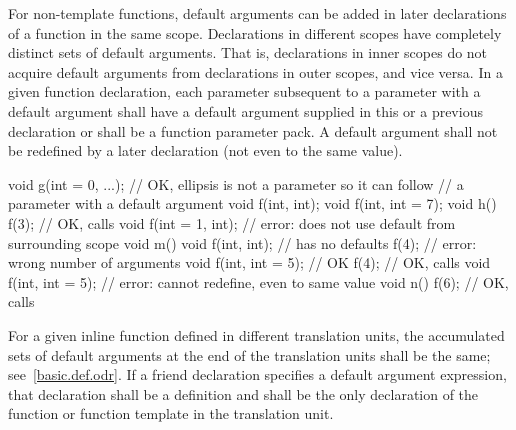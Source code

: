 \pnum
For non-template functions, default arguments can be added in later
declarations of a
function in the same scope.
Declarations in different
scopes have completely distinct sets of default arguments.
That
is, declarations in inner scopes do not acquire default
arguments from declarations in outer scopes, and vice versa.
In
a given function declaration, each parameter subsequent to a
parameter with a default argument shall have a default argument
supplied in this or a previous declaration
or shall be a function parameter pack.
A default argument
shall not be redefined by a later declaration (not even to the
same value).
\begin{example}

\begin{codeblock}
void g(int = 0, ...);           // OK, ellipsis is not a parameter so it can follow
                                // a parameter with a default argument
void f(int, int);
void f(int, int = 7);
void h() {
  f(3);                         // OK, calls 
  void f(int = 1, int);         // error: does not use default from surrounding scope
}
void m() {
  void f(int, int);             // has no defaults
  f(4);                         // error: wrong number of arguments
  void f(int, int = 5);         // OK
  f(4);                         // OK, calls 
  void f(int, int = 5);         // error: cannot redefine, even to same value
}
void n() {
  f(6);                         // OK, calls 
}
\end{codeblock}
\end{example}
For a given inline function defined in different translation units,
the accumulated sets of default arguments at the end of the
translation units shall be the same;
see~\ref{basic.def.odr}.
If a friend declaration specifies a default argument expression,
that declaration shall be a definition and shall be the only
declaration of the function or function template in the translation unit.

